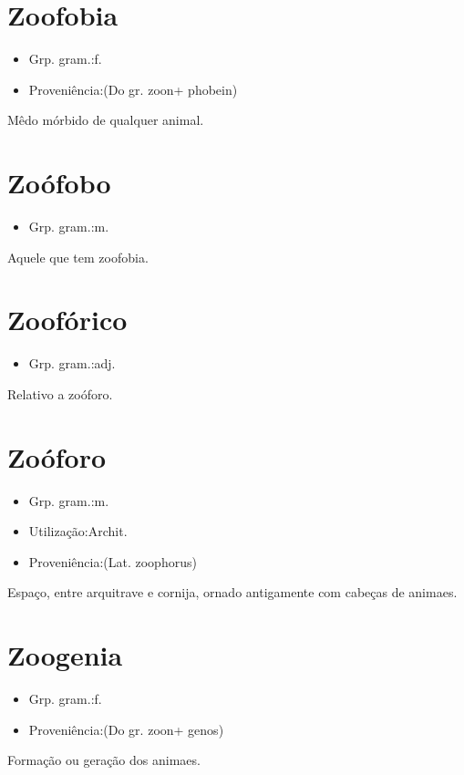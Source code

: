 \section{Zoofobia}
\begin{itemize}
\item {Grp. gram.:f.}
\end{itemize}
\begin{itemize}
\item {Proveniência:(Do gr. \textunderscore zoon\textunderscore  + \textunderscore phobein\textunderscore )}
\end{itemize}
Mêdo mórbido de qualquer animal.
\section{Zoófobo}
\begin{itemize}
\item {Grp. gram.:m.}
\end{itemize}
Aquele que tem zoofobia.
\section{Zoofórico}
\begin{itemize}
\item {Grp. gram.:adj.}
\end{itemize}
Relativo a zoóforo.
\section{Zoóforo}
\begin{itemize}
\item {Grp. gram.:m.}
\end{itemize}
\begin{itemize}
\item {Utilização:Archit.}
\end{itemize}
\begin{itemize}
\item {Proveniência:(Lat. \textunderscore zoophorus\textunderscore )}
\end{itemize}
Espaço, entre arquitrave e cornija, ornado antigamente com cabeças de animaes.
\section{Zoogenia}
\begin{itemize}
\item {Grp. gram.:f.}
\end{itemize}
\begin{itemize}
\item {Proveniência:(Do gr. \textunderscore zoon\textunderscore  + \textunderscore genos\textunderscore )}
\end{itemize}
Formação ou geração dos animaes.
